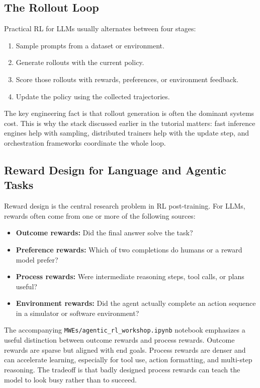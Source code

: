 \documentclass[class=article,crop=false]{standalone}
\begin{document}
\subsection{The Rollout Loop}
\label{sec:rl:rollouts}

Practical RL for LLMs usually alternates between four stages:
\begin{enumerate}
  \item Sample prompts from a dataset or environment.
  \item Generate rollouts with the current policy.
  \item Score those rollouts with rewards, preferences, or environment feedback.
  \item Update the policy using the collected trajectories.
\end{enumerate}

The key engineering fact is that rollout generation is often the dominant systems cost. This is why the stack discussed earlier in the tutorial matters: fast inference engines help with sampling, distributed trainers help with the update step, and orchestration frameworks coordinate the whole loop.

\subsection{Reward Design for Language and Agentic Tasks}
\label{sec:rl:rewards}

Reward design is the central research problem in RL post-training. For LLMs, rewards often come from one or more of the following sources:
\begin{itemize}
  \item \textbf{Outcome rewards:} Did the final answer solve the task?
  \item \textbf{Preference rewards:} Which of two completions do humans or a reward model prefer?
  \item \textbf{Process rewards:} Were intermediate reasoning steps, tool calls, or plans useful?
  \item \textbf{Environment rewards:} Did the agent actually complete an action sequence in a simulator or software environment?
\end{itemize}

The accompanying \texttt{MWEs/agentic\_rl\_workshop.ipynb} notebook emphasizes a useful distinction between outcome rewards and process rewards. Outcome rewards are sparse but aligned with end goals. Process rewards are denser and can accelerate learning, especially for tool use, action formatting, and multi-step reasoning. The tradeoff is that badly designed process rewards can teach the model to look busy rather than to succeed.
\end{document}
